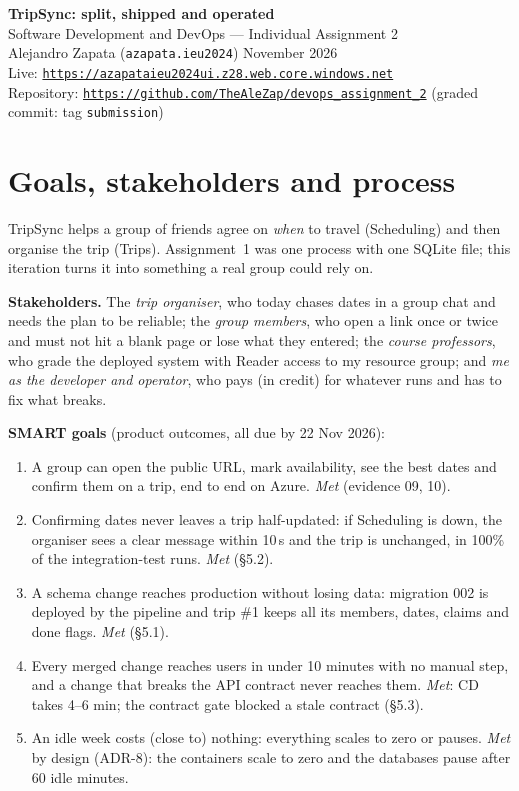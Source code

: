 \documentclass[10pt,a4paper]{article}
\newcommand{\code}[1]{\texttt{#1}}
\begin{document}
\begin{center}
{\LARGE\bfseries\color{ink} TripSync: split, shipped and operated}\\[3pt]
{\normalsize Software Development and DevOps --- Individual Assignment 2}\\[2pt]
{\small Alejandro Zapata (\code{azapata.ieu2024}) \quad\textbullet{} November 2026}\\[4pt]
{\small Live: \href{https://azapataieu2024ui.z28.web.core.windows.net}{\code{https://azapataieu2024ui.z28.web.core.windows.net}}}\\[1pt]
{\small Repository: \href{https://github.com/TheAleZap/devops_assignment_2}{\code{https://github.com/TheAleZap/devops\_assignment\_2}} (graded commit: tag \code{submission})}
\end{center}

\section{Goals, stakeholders and process}

TripSync helps a group of friends agree on \emph{when} to travel (Scheduling) and then organise the trip (Trips).
Assignment~1 was one process with one SQLite file; this iteration turns it into something a real group could rely on.

\textbf{Stakeholders.} The \emph{trip organiser}, who today chases dates in a group chat and needs the plan to be reliable;
the \emph{group members}, who open a link once or twice and must not hit a blank page or lose what they entered;
the \emph{course professors}, who grade the deployed system with Reader access to my resource group;
and \emph{me as the developer and operator}, who pays (in credit) for whatever runs and has to fix what breaks.

\textbf{SMART goals} (product outcomes, all due by 22 Nov 2026):
\begin{enumerate}
  \item A group can open the public URL, mark availability, see the best dates and confirm them on a trip, end to end on Azure. \emph{Met} (evidence 09, 10).
  \item Confirming dates never leaves a trip half-updated: if Scheduling is down, the organiser sees a clear message within 10\,s and the trip is unchanged, in 100\% of the integration-test runs. \emph{Met} (§5.2).
  \item A schema change reaches production without losing data: migration 002 is deployed by the pipeline and trip \#1 keeps all its members, dates, claims and done flags. \emph{Met} (§5.1).
  \item Every merged change reaches users in under 10 minutes with no manual step, and a change that breaks the API contract never reaches them. \emph{Met}: CD takes 4--6 min; the contract gate blocked a stale contract (§5.3).
  \item An idle week costs (close to) nothing: everything scales to zero or pauses. \emph{Met} by design (ADR-8): the containers scale to zero and the databases pause after 60 idle minutes.
\end{enumerate}
\end{document}
